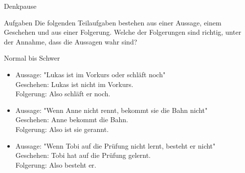 {
\begin{frame}{Denkpause}
    \begin{alertblock}{Aufgaben}
      Die folgenden Teilaufgaben bestehen aus einer Aussage, einem Geschehen und aus einer Folgerung. Welche der Folgerungen sind richtig, unter der Annahme, 
      dass die Aussagen wahr sind?
    \end{alertblock}
    \begin{block}{Normal bis Schwer}
    \begin{itemize}
        \item Aussage: "Lukas ist im Vorkurs oder schläft noch"\\
        Geschehen: Lukas ist nicht im Vorkurs.\\
        Folgerung: Also schläft er noch.
        \item Aussage: "Wenn Anne nicht rennt, bekommt sie die Bahn nicht"\\
        Geschehen: Anne bekommt die Bahn.\\
        Folgerung: Also ist sie gerannt.
        \item Aussage: "Wenn Tobi auf die Prüfung nicht lernt, besteht er nicht"\\
        Geschehen: Tobi hat auf die Prüfung gelernt.\\
        Folgerung: Also besteht er.
    \end{itemize}
    \end{block}
\end{frame}


}
